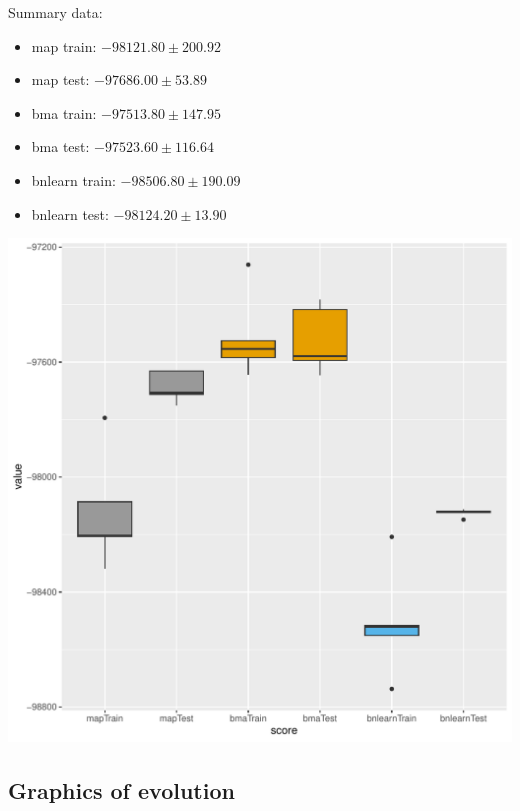 \documentclass[]{scrartcl}
\begin{document}
Summary data:

\begin{itemize}
\item map train:  $-98121.80  \pm  200.92$
\item map test:  $-97686.00  \pm  53.89$
\item bma train:  $-97513.80  \pm  147.95$
\item bma test:  $-97523.60  \pm  116.64$
\item bnlearn train:  $-98506.80  \pm  190.09$
\item bnlearn test:  $-98124.20  \pm  13.90$
\end{itemize}

\includegraphics[scale = 0.5]{./figs/hepar2/hepar2-boxplots.pdf}

\subsection{Graphics of evolution}
\end{document}

